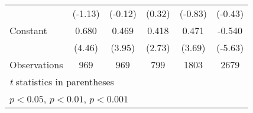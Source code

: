 {\begin{longtable}{l*{5}{c}}
                &  (-1.13)         &  (-0.12)         &   (0.32)         &  (-0.83)         &  (-0.43)         \\
[1em]
Constant        &    0.680\sym{***}&    0.469\sym{***}&    0.418\sym{**} &    0.471\sym{***}&   -0.540\sym{***}\\
                &   (4.46)         &   (3.95)         &   (2.73)         &   (3.69)         &  (-5.63)         \\
\hline
Observations    &      969         &      969         &      799         &     1803         &     2679         \\
\hline\hline
\multicolumn{6}{l}{\footnotesize \textit{t} statistics in parentheses}\\
\multicolumn{6}{l}{\footnotesize \sym{*} \(p<0.05\), \sym{**} \(p<0.01\), \sym{***} \(p<0.001\)}\\
\end{longtable}
}
